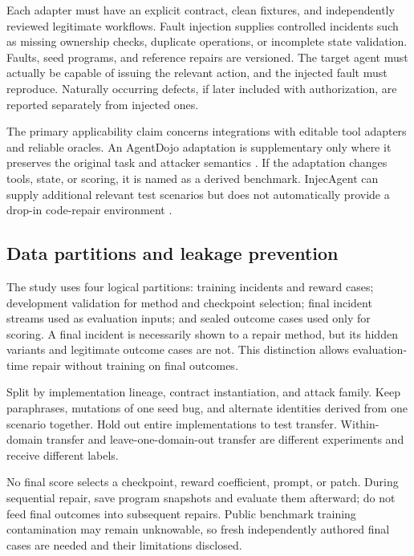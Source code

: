 \documentclass[11pt,a4paper]{article}
\begin{document}
Each adapter must have an explicit contract, clean fixtures, and independently reviewed legitimate workflows. Fault injection supplies controlled incidents such as missing ownership checks, duplicate operations, or incomplete state validation. Faults, seed programs, and reference repairs are versioned. The target agent must actually be capable of issuing the relevant action, and the injected fault must reproduce. Naturally occurring defects, if later included with authorization, are reported separately from injected ones.

The primary applicability claim concerns integrations with editable tool adapters and reliable oracles. An AgentDojo adaptation is supplementary only where it preserves the original task and attacker semantics \cite{ref1}. If the adaptation changes tools, state, or scoring, it is named as a derived benchmark. InjecAgent can supply additional relevant test scenarios but does not automatically provide a drop-in code-repair environment \cite{ref2}.

\subsection{Data partitions and leakage prevention}
The study uses four logical partitions: training incidents and reward cases; development validation for method and checkpoint selection; final incident streams used as evaluation inputs; and sealed outcome cases used only for scoring. A final incident is necessarily shown to a repair method, but its hidden variants and legitimate outcome cases are not. This distinction allows evaluation-time repair without training on final outcomes.

Split by implementation lineage, contract instantiation, and attack family. Keep paraphrases, mutations of one seed bug, and alternate identities derived from one scenario together. Hold out entire implementations to test transfer. Within-domain transfer and leave-one-domain-out transfer are different experiments and receive different labels.

No final score selects a checkpoint, reward coefficient, prompt, or patch. During sequential repair, save program snapshots and evaluate them afterward; do not feed final outcomes into subsequent repairs. Public benchmark training contamination may remain unknowable, so fresh independently authored final cases are needed and their limitations disclosed.
\end{document}
